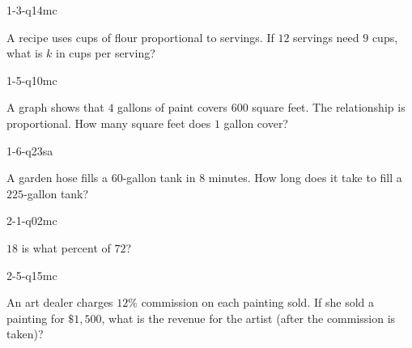 
\begin{practiceQuestion}{1-3-q14}{mc}
\begin{questionText}
A recipe uses cups of flour proportional to servings. If $12$ servings need $9$ cups, what is $k$ in cups per serving?
\end{questionText}
\end{practiceQuestion}

\begin{practiceQuestion}{1-5-q10}{mc}
\begin{questionText}
A graph shows that $4$ gallons of paint covers $600$ square feet. The relationship is proportional. How many square feet does $1$ gallon cover?
\end{questionText}
\end{practiceQuestion}

\begin{practiceQuestion}{1-6-q23}{sa}
\begin{questionText}
A garden hose fills a $60$-gallon tank in $8$ minutes. How long does it take to fill a $225$-gallon tank?
\end{questionText}
\end{practiceQuestion}

\begin{practiceQuestion}{2-1-q02}{mc}
\begin{questionText}
$18$ is what percent of $72$?
\end{questionText}
\end{practiceQuestion}

\begin{practiceQuestion}{2-5-q15}{mc}
\begin{questionText}
An art dealer charges $12\%$ commission on each painting sold. If she sold a painting for $\$1{,}500$, what is the revenue for the artist (after the commission is taken)?
\end{questionText}
\end{practiceQuestion}

